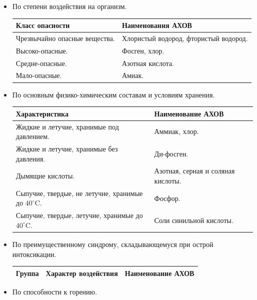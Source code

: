 \documentclass[12pt]{article}
\begin{document}
	\begin{itemize}
		\item По степени воздействия на организм.
		
		\begin{xltabular}{\textwidth}{|X|X|}
			\hline
			\textbf{Класс опасности} & \textbf{Наименования АХОВ}\\
			\hline
			Чрезвычайно опасные вещества. & Хлористый водород, фтористый водород.\\
			\hline
			Высоко-опасные. & Фосген, хлор.\\
			\hline
			Средне-опасные. & Азотная кислота.\\
			\hline
			Мало-опасные. & Амиак.\\
			\hline
		\end{xltabular}
		
		\item По основным физико-химическим составам и условиям хранения.
		
		\begin{xltabular}{\textwidth}{|X|X|}
			\hline
			\textbf{Характеристика} & \textbf{Наименование АХОВ}\\
			\hline
			Жидкие и летучие, хранимые под давлением. & Аммиак, хлор.\\
			\hline
			Жидкие и летучие, хранимые без давления. & Ди-фосген.\\
			\hline
			Дымящие кислоты. & Азотная, серная и соляная кислоты.\\
			\hline
			Сыпучие, твердые, не летучие, хранимые до $40^{\circ}$C. & Фосфор.\\
			\hline
			Сыпучие, твердые, летучие, хранимые до $40^{\circ}$C. & Соли синильной кислоты.\\
			\hline
		\end{xltabular}
		
		\item По преимущественному синдрому, складывающемуся при острой интоксикации.
		
		\begin{xltabular}{\textwidth}{|X|X|X|}
			\hline
			\textbf{Группа} & \textbf{Характер воздействия} & \textbf{Наименование АХОВ}\\
			\hline
		\end{xltabular}
		
		\item По способности к горению.
		

\end{itemize}
\end{document}
